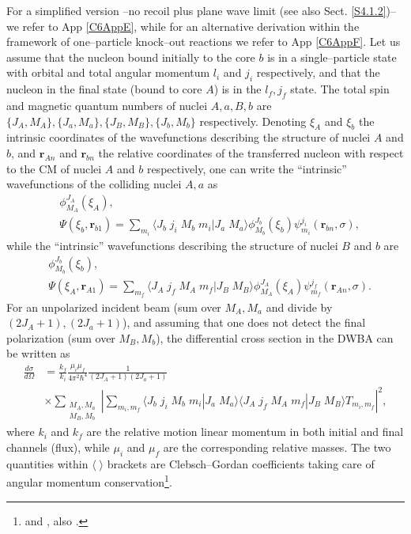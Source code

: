 For a simplified version --no recoil plus plane wave limit (see also Sect. \ref{S4.1.2})-- we refer to App \ref{C6AppE}, while for an alternative derivation within the framework of one--particle knock--out reactions we refer to App \ref{C6AppF}.
Let us assume that the nucleon bound initially to the core $b$ is in a single--particle state with orbital and total angular momentum $l_i$ and  $j_i$ respectively, and that the nucleon in the final state (bound to core $A$)  is in the $l_f,j_f$ state. The total spin and magnetic quantum numbers of nuclei $A,a,B,b$ are $\{J_A,M_A\},\{J_a,M_a\},\{J_B,M_B\},\{J_b,M_b\}$ respectively. Denoting $\xi_A$ and $\xi_b$ the intrinsic coordinates of the wavefunctions describing the structure of nuclei $A$ and $b$, and $\mathbf{r}_{An}$ and $\mathbf{r}_{bn}$ the relative coordinates of the transferred nucleon with respect to the CM of nuclei $A$ and $b$ respectively, one can write the ``intrinsic''  wavefunctions of the colliding nuclei $A,a$ as 
\begin{equation}\label{eq_onept2}
    \begin{split}
    &\phi_{M_A}^{J_A}(\xi_A),\\
    &\Psi(\xi_b,\mathbf{r}_{b1})=\sum_{m_i}\langle J_b\;j_i\;M_b\;m_i|J_a\;M_a\rangle\phi_{M_b}^{J_b}(\xi_b)\psi_{m_i}^{j_i}(\mathbf{r}_{bn},\sigma),
    \end{split}
\end{equation}
while the ``intrinsic'' wavefunctions describing the structure of nuclei $B$ and $b$ are
\begin{equation}\label{eq_onept3}
    \begin{split}
    &\phi_{M_b}^{J_b}(\xi_b),\\
    &\Psi(\xi_A,\mathbf{r}_{A1})=\sum_{m_f}\langle J_A\;j_f\;M_A\;m_f|J_B\;M_B\rangle\phi_{M_A}^{J_A}(\xi_A)\psi_{m_f}^{j_f}(\mathbf{r}_{An},\sigma).
    \end{split}
\end{equation}
For an unpolarized incident beam (sum over $M_A,M_a$ and divide  by $(2J_A+1),(2J_a+1)$), and assuming that  one does not detect the final polarization (sum over $M_B,M_b$), the differential cross section in the DWBA can be written as
\begin{equation}\label{eq_onept4}
    \begin{split}
\frac{d\sigma}{d\Omega}&=\frac{k_f}{k_i}\frac{\mu_i\mu_f}{4\pi^2\hbar^4}\frac{1}{(2J_A+1)(2J_a+1)}\\
&\times\sum_{\substack{M_A,M_a\\M_B,M_b}}\left|\sum_{m_i,m_f}\langle J_b\;j_i\;M_b\;m_i|J_a\;M_a\rangle\langle J_A\;j_f\;M_A\;m_f|J_B\;M_B\rangle T_{m_i,m_f}\right|^2,
    \end{split}
\end{equation}
where $k_i$ and $k_f$ are the relative motion linear momentum in both initial and final channels (flux), while $\mu_i$ and $\mu_f$ are the corresponding relative masses. The two quantities within $\langle\;\rangle$ brackets are Clebsch--Gordan coefficients taking care of angular momentum conservation\footnote{\cite{Brink:68} and \cite{Edmonds:60}, also \cite{Bohr:69}.}.


